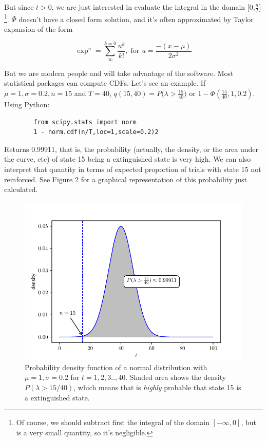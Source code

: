 \documentclass[11pt]{article}
\begin{document}
But since $t > 0$, we are just interested in evaluate the integral in the domain [0,$\frac{n}{T}$] \footnote{Of course,
    we should subtract first the integral of the domain $[-\infty, 0]$, but is a very small quantity, so it's negligible.}.
$\Phi$ doesn't have a closed form solution, and it's often approximated by Taylor expansion of the form

    \[
        \exp^{u} = \sum^{k=0}_{\infty} \frac{u^k}{k!}, \; \text{for } u = \frac{-(x - \mu)}{2 \sigma^2}
    \]

But we are modern people and will take advantage of the software.
Most statistical packages can compute CDFs.
Let's see an example.
If $\mu = 1, \sigma = 0.2, n = 15$
and $T = 40$, $q(15,40) = P \Big( \lambda > \frac{15}{40} \Big)$ or $1 - \Phi(\frac{15}{40},1,0.2)$. Using \textsf{Python}:

    \begin{verbatim}
        from scipy.stats import norm
        1 - norm.cdf(n/T,loc=1,scale=0.2)2
    \end{verbatim}

Returns 0.99911, that is, the probability (actually, the density, or the area under the curve, etc) of state 15 being a
    extinguished state is very high.
    We can also interpret that quantity in terms of expected proportion of trials with state
    15 not reinforced.
    See Figure 2 for a graphical representation of this probability just calculated.

    \begin{figure}[H]
        \centering
        \includegraphics[scale=0.65]{lambda_nT}
        \caption{Probability density function of a normal distribution with $\mu = 1, \sigma = 0.2$ for $t = 1,2,3..,40$.
        Shaded area shows the density $P(\lambda > 15/40)$, which means that is \textit{highly} probable that state 15
        is a extinguished state.}
    \end{figure}
\end{document}
